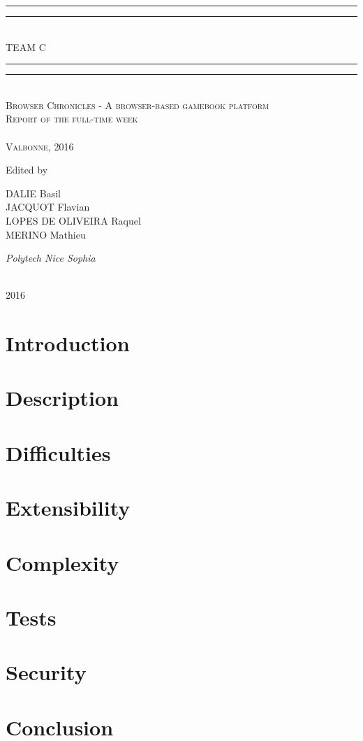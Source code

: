 \documentclass[12pt]{book}
\newcommand*{\titleGP}{\begingroup %
\centering %
\vspace*{\baselineskip} %

\rule{\textwidth}{1.6pt}\vspace*{-\baselineskip}\vspace*{2pt} %
\rule{\textwidth}{0.4pt}\\[\baselineskip] %

{\LARGE TEAM C}\\[0.2\baselineskip] %

\rule{\textwidth}{0.4pt}\vspace*{-\baselineskip}\vspace{3.2pt} %
\rule{\textwidth}{1.6pt}\\[\baselineskip] %

\scshape %
Browser Chronicles - A browser-based gamebook platform \\ %
Report of the full-time week \\
 \\[\baselineskip] %
Valbonne,  2016\par %

\vspace*{2\baselineskip} %

Edited by \\[\baselineskip]
{\Large DALIE Basil \\ JACQUOT Flavian\\LOPES DE OLIVEIRA Raquel \\ MERINO Mathieu
\par} %
{\itshape Polytech Nice Sophia \par} %

\vfill %

\plogo \\[0.3\baselineskip] %
{\scshape 2016} \\[0.3\baselineskip] %

\endgroup}
\begin{document}
 
\titleGP

\begingroup
\let\cleardoublepage\clearpage
\renewcommand{\contentsname}{Summary}
\tableofcontents
\endgroup


\newpage
\section{Introduction}


\newpage
\section{Description}



\newpage
\section{Difficulties}


\section{Extensibility}


\section{Complexity}


\section{Tests}


\section{Security}


\newpage
\section{Conclusion}

    
\end{document}
